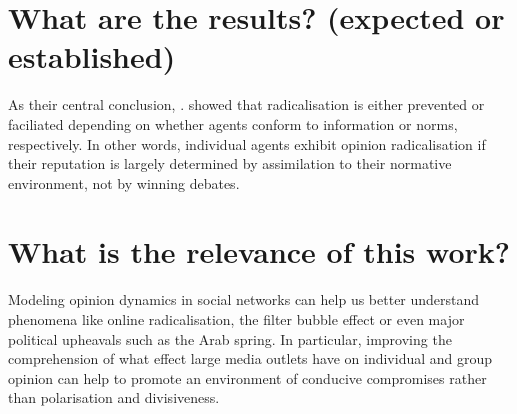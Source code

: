 \section{What are the results? (expected or established)}
As their central conclusion, \cite{dykstra2013}. showed that radicalisation is either prevented or faciliated depending on whether agents conform to information or norms, respectively. In other words, individual agents exhibit opinion radicalisation if their reputation is largely determined by assimilation to their normative environment, not by winning debates.


\section{What is the relevance of this work?}
Modeling opinion dynamics in social networks can help us better understand phenomena like online radicalisation, the filter bubble effect or even major political upheavals such as the Arab spring. In particular, improving the comprehension of what effect large media outlets have on individual and group opinion can help to promote an environment of conducive compromises rather than polarisation and divisiveness. 





